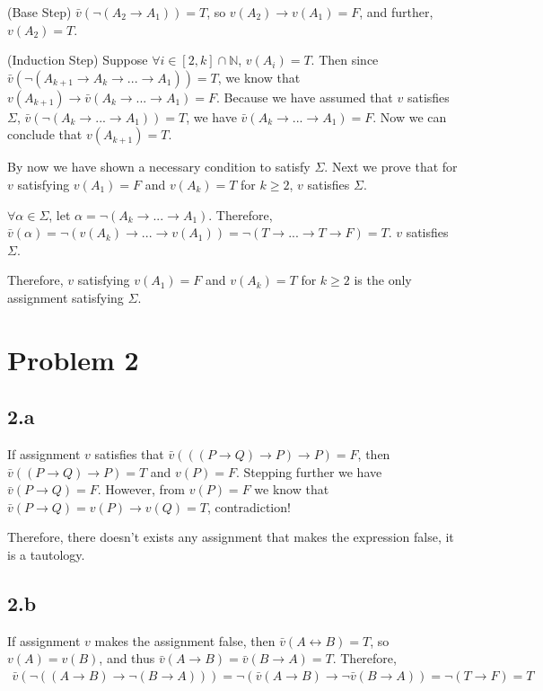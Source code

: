 \documentclass{article}
\begin{document}
(Base Step) $\bar{v}\left( \neg\left( A_2 \to A_1 \right) \right)=T$, so $v(A_2) \to v(A_1) = F$, and further, $v(A_2)=T$.

(Induction Step) Suppose $\forall i \in [2, k] \cap \mathbb{N}$, $v(A_i)=T$. Then since $\bar{v}\left( \neg \left( A_{k+1} \to A_k \to ... \to A_1 \right) \right)=T$, we know that $v(A_{k+1}) \to \bar{v}\left( A_k \to ... \to A_1 \right) = F$. Because we have assumed that $v$ satisfies $\Sigma$, $\bar{v}\left( \neg \left( A_k \to ... \to A_1 \right)\right)=T$, we have $\bar{v}\left( A_k \to ... \to A_1 \right)=F$. Now we can conclude that $v(A_{k+1})=T$.

By now we have shown a necessary condition to satisfy $\Sigma$. Next we prove that for $v$ satisfying $v(A_1)=F$ and $v(A_k)=T$ for $k\ge 2$, $v$ satisfies $\Sigma$.

$\forall \alpha \in \Sigma$, let $\alpha=\neg\left( A_k \to ... \to A_1 \right)$. Therefore, $\bar{v}(\alpha)=\neg \left( v(A_k) \to ... \to v(A_1) \right) = \neg \left( T\to ... \to T \to F\right) = T$. $v$ satisfies $\Sigma$.

Therefore, $v$ satisfying $v(A_1)=F$ and $v(A_k)=T$ for $k\ge 2$ is the only assignment satisfying $\Sigma$.


\section*{Problem 2}

\subsection*{2.a}

If assignment $v$ satisfies that $\bar{v}\left( \left( \left( P \to Q \right) \to P \right) \to P \right)=F$, then $\bar{v}\left( \left( P \to Q \right) \to P\right) = T$ and $v(P)=F$. Stepping further we have $\bar{v}\left( P \to Q \right) = F$. However, from $v(P)=F$ we know that $\bar{v}(P \to Q)=v(P) \to v(Q)=T$, contradiction!

Therefore, there doesn't exists any assignment that makes the expression false, it is a tautology.

\subsection*{2.b}

If assignment $v$ makes the assignment false, then $\bar{v}(A \leftrightarrow B) = T$, so $v(A)=v(B)$, and thus $\bar{v}(A\to B)=\bar{v}(B\to A)=T$. Therefore,
\begin{align*}
\bar{v}\left( \neg \left( \left(A\to B\right) \to \neg\left( B\to A\right) \right) \right) = \neg \left( \bar{v}(A \to B) \to \neg \bar{v}\left( B\to A\right) \right) = \neg (T \to F) = T
\end{align*}
\end{document}
